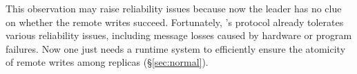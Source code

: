
This observation may raise reliability issues because now the leader has no 
clue on whether the remote writes succeed. Fortunately, \paxos's protocol 
already tolerates various reliability issues, including message losses caused by
hardware or program failures. Now one just needs a runtime system to 
efficiently ensure the atomicity of remote writes among replicas 
(\S\ref{sec:normal}).






